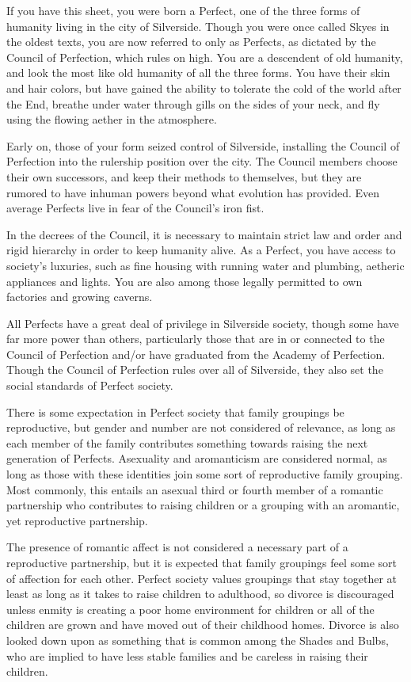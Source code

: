 \documentclass[blue]{Silversiders}
\begin{document}
\name{\bPerfects{}}

If you have this sheet, you were born a Perfect, one of the three forms of humanity living in the city of Silverside. Though you were once called Skyes in the oldest texts, you are now referred to only as Perfects, as dictated by the Council of Perfection, which rules on high. You are a descendent of old humanity, and look the most like old humanity of all the three forms. You have their skin and hair colors, but have gained the ability to tolerate the cold of the world after the End, breathe under water through gills on the sides of your neck, and fly using the flowing aether in the atmosphere.

Early on, those of your form seized control of Silverside, installing the Council of Perfection into the rulership position over the city. The Council members choose their own successors, and keep their methods to themselves, but they are rumored to have inhuman powers beyond what evolution has provided. Even average Perfects live in fear of the Council's iron fist.

In the decrees of the Council, it is necessary to maintain strict law and order and rigid hierarchy in order to keep humanity alive. As a Perfect, you have access to society's luxuries, such as fine housing with running water and plumbing, aetheric appliances and lights. You are also among those legally permitted to own factories and growing caverns. 

All Perfects have a great deal of privilege in Silverside society, though some have far more power than others, particularly those that are in or connected to the Council of Perfection and/or have graduated from the Academy of Perfection. Though the Council of Perfection rules over all of Silverside, they also set the social standards of Perfect society.

There is some expectation in Perfect society that family groupings be reproductive, but gender and number are not considered of relevance, as long as each member of the family contributes something towards raising the next generation of Perfects. Asexuality and aromanticism are considered normal, as long as those with these identities join some sort of reproductive family grouping. Most commonly, this entails an asexual third or fourth member of a romantic partnership who contributes to raising children or a grouping with an aromantic, yet reproductive partnership. 

The presence of romantic affect is not considered a necessary part of a reproductive partnership, but it is expected that family groupings feel some sort of affection for each other. Perfect society values groupings that stay together at least as long as it takes to raise children to adulthood, so divorce is discouraged unless enmity is creating a poor home environment for children or all of the children are grown and have moved out of their childhood homes. Divorce is also looked down upon as something that is common among the Shades and Bulbs, who are implied to have less stable families and be careless in raising their children.
\end{document}
